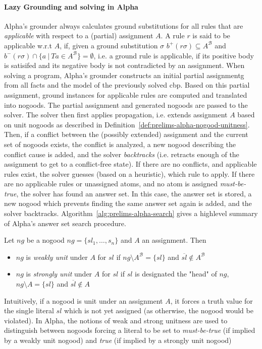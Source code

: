 \paragraph{Lazy Grounding and solving in Alpha~\cite{alpha-techniques}}
Alpha's grounder always calculates ground substitutions for all rules that are \emph{applicable} with respect to a (partial) assignment $A$. A rule $r$ is said to be applicable w.r.t $A$, if, given a ground substitution $\sigma$ $b^{+}(r\sigma) \subseteq A^{\mathcal{B}}$ and $b^{-}(r\sigma) \cap \{a~|~Ta \in A^{\mathcal{B}}\} = \emptyset$, i.e. a ground rule is applicable, if its positive body is satisifed and its negative body is not contradicted by an assignment.
When solving a program, Alpha's grounder constructs an initial partial assignmentg from all facts and the model of the previously solved \gls{cbp}. Based on this partial assignment, ground instances for applicable rules are computed and translated into nogoods. The partial assignment and generated nogoods are passed to the solver. The solver then first applies propagation, i.e. extends assignment $A$ based on unit nogoods as described in Definition~\ref{def:prelims-alpha-nogood-unitness}. Then, if a conflict between the (possibly extended) assignment and the current set of nogoods exists, the conflict is analyzed, a new nogood describing the conflict cause is added, and the solver \emph{backtracks} (i.e. retracts enough of the assignment to get to a conflict-free state). If there are no conflicts, and applicable rules exist, the solver guesses (based on a heuristic), which rule to apply. If there are no applicable rules or unassigned atoms, and no atom is assigned \emph{must-be-true}, the solver has found an answer set. In this case, the answer set is stored, a new nogood which prevents finding the same answer set again is added, and the solver backtracks. Algorithm~\ref{alg:prelims-alpha-search} gives a highlevel summary of Alpha's answer set search procedure.

\begin{definition}
\label{def:prelims-alpha-nogood-unitness}	
Let $ng$ be a nogood $ng = \{sl_1,\ldots,s_n\}$ and $A$ an assignment. Then
\begin{itemize}
	\item $ng$ is \emph{weakly unit} under $A$ for $sl$ if $ng \setminus A^{\mathcal{B}} = \{sl\}$ and $\overline{sl} \notin A^{\mathcal{B}}$
	\item $ng$ is \emph{strongly unit} under $A$ for $sl$ if $sl$ is designated the "head" of $ng$, $ng \setminus A = \{sl\}$ and $\overline{sl} \notin A$
\end{itemize}	
Intuitively, if a nogood is unit under an assignment $A$, it forces a truth value for the single literal $sl$ which is not yet assigned (as otherwise, the nogood would be violated). In Alpha, the notions of weak and strong unitness are used to distinguish between nogoods forcing a literal to be set to \emph{must-be-true} (if implied by a weakly unit nogood) and \emph{true} (if implied by a strongly unit nogood)
\end{definition}	

